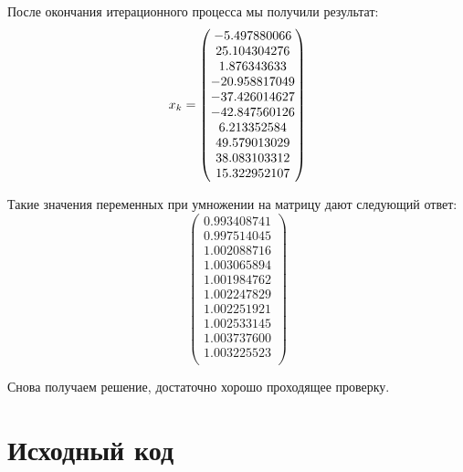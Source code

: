\documentclass[../../report.tex]{subfiles}
\begin{document}
После окончания итерационного процесса мы получили результат:
\[
x_{k} = \begin{pmatrix} -5.497880066 \\ 25.104304276 \\ 1.876343633 \\ -20.958817049 \\ -37.426014627 \\ -42.847560126 \\ 6.213352584 \\ 49.579013029 \\ 38.083103312 \\ 15.322952107 \\ \end{pmatrix}
\]

Такие значения переменных при умножении на матрицу дают следующий ответ:
\[
\begin{pmatrix}
    0.993408741 \\
    0.997514045 \\
    1.002088716 \\
    1.003065894 \\
    1.001984762 \\
    1.002247829 \\
    1.002251921 \\
    1.002533145 \\
    1.003737600 \\
    1.003225523 \\
\end{pmatrix}
\]

Снова получаем решение, достаточно хорошо проходящее проверку.

\section{Исходный код}
\end{document}
